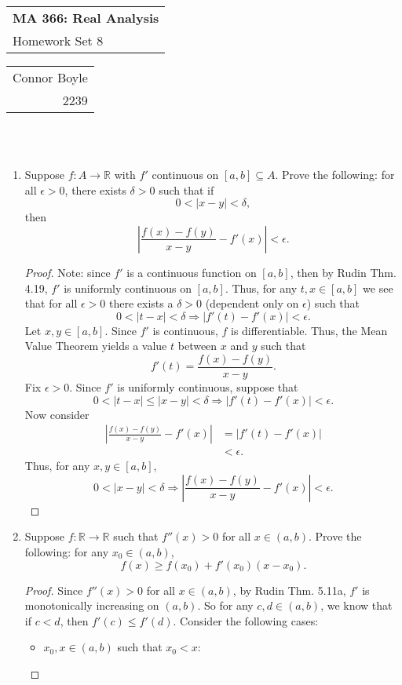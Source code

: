 \documentclass{amsart}
\def\name{Connor Boyle} %
\def\CM{2239} %
\def\hwnum{8} %
\begin{document}
    \noindent
    \thispagestyle{firststyle}
    \begin{tabular}{l}
    {\LARGE \textbf{MA 366: Real Analysis} }\\
    {\Large Homework Set \hwnum}
    \end{tabular} \hfill \begin{tabular}{r}
                            \name \\
                            \CM
                            \end{tabular}
    
    \noindent \hrulefill \\\\
    \begin{enumerate}[1.]
    \item Suppose $f: A \to \mathbb{R}$ with $f'$ continuous on $[a,b] \subseteq A$. Prove the following: for all $\epsilon >0$, there exists $\delta >0$ such that if
    \[ 0 < | x-y | < \delta,\]
    then
    \[ \left| \frac{f(x)-f(y)}{x-y} - f'(x) \right| < \epsilon.\]
    \begin{proof}
        Note: since $f'$ is a continuous function on $[a,b]$, then by Rudin Thm. 4.19, $f'$ is uniformly continuous
        on $[a,b]$. Thus, for any $t,x \in [a,b]$ we see that for all $\epsilon > 0$ there exists a $\delta > 0$ 
        (dependent only on $\epsilon$) such that
        \[
            0 < |t - x| < \delta \Rightarrow |f'(t) - f'(x)| < \epsilon.
        \] 
        Let $x,y \in [a,b]$. Since $f'$ is continuous, $f$ is differentiable. Thus, the Mean Value Theorem yields a value $t$ between $x$ and $y$ such that
        \[
            f'(t) = \frac{f(x)-f(y)}{x-y}.
        \]
        Fix $\epsilon > 0$. Since $f'$ is uniformly continuous, suppose that 
        \[
            0 < |t - x| \leq |x - y| < \delta \Rightarrow |f'(t) - f'(x)| < \epsilon. 
        \]
        Now consider
        \begin{align*}
            \left| \frac{f(x)-f(y)}{x-y} - f'(x) \right| &= |f'(t) - f'(x)| \\
            &< \epsilon.
        \end{align*}
        Thus, for any $x,y \in [a,b]$,
        \[
            0 < |x - y| < \delta \Rightarrow \left| \frac{f(x)-f(y)}{x-y} - f'(x) \right| < \epsilon.
        \]
    \end{proof}
    
    \newpage
    
    \item Suppose $f: \mathbb{R} \to \mathbb{R}$ such that $f''(x) >0$ for all $x \in (a,b)$. Prove the following: for any $x_0 \in (a,b)$,
    \[ f(x) \geq f(x_0) + f'(x_0)(x-x_0).\]
    \begin{proof}
        Since $f''(x) > 0$ for all $x \in (a,b)$, by Rudin Thm. 5.11a, $f'$ is monotonically increasing on $(a,b)$.
        So for any $c,d \in (a,b)$, we know that if $c < d$, then $f'(c) \leq f'(d)$.
        Consider the following cases:
        \begin{itemize}
            \item $x_0,x \in (a,b)$ such that $x_0 < x$:


\end{itemize}
\end{proof}
\end{enumerate}
\end{document}
